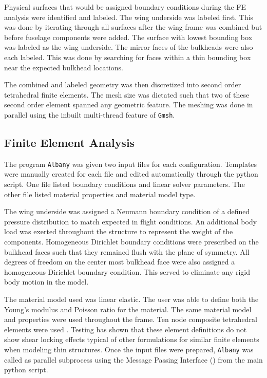 \documentclass[conf]{new-aiaa}
\begin{document}
Physical surfaces that would be assigned boundary conditions 
during the FE analysis were identified and labeled.
The wing underside was labeled first.
This was done by iterating through all surfaces after 
the wing frame was combined but before fuselage components 
were added.
The surface with lowest bounding box was labeled as the 
wing underside.
The mirror faces of the bulkheads were also each labeled.
This was done by searching for faces within a thin
bounding box near the expected bulkhead locations.

The combined and labeled geometry was then discretized 
into second order tetrahedral finite elements.
The mesh size was dictated such that two of these
second order element spanned any geometric feature.
The meshing was done in parallel using the
inbuilt multi-thread feature of \texttt{Gmsh}.


\subsection{Finite Element Analysis}
The program \texttt{Albany} was given two input files for 
each configuration. 
Templates were manually created for each file and edited 
automatically through the python script.
One file listed boundary conditions and linear solver
parameters.
The other file listed material properties and material 
model type.

The wing underside was assigned a
Neumann boundary condition of a defined pressure distribution
to match expected in flight conditions.
An additional body load was exerted throughout the
structure to represent the weight of the components.
Homogeneous Dirichlet boundary conditions were 
prescribed on the bulkhead faces such that
they remained flush with the plane of symmetry.
All degrees of freedom on the center most
bulkhead face were also assigned a
homogeneous Dirichlet boundary condition.
This served to eliminate any rigid body motion in the model.

The material model used was linear elastic.
The user was able to define both the
Young's modulus and Poisson ratio for the material.
The same material model and properties were used throughout
the frame.
Ten node composite tetrahedral elements were used
\cite{ostien_10_node_comp_tet_FE_for_solid_mechanics}.
Testing has shown that these element definitions do not 
show shear locking effects typical of other 
formulations for similar finite elements 
when modeling thin structures.
Once the input files were prepared,
\texttt{Albany} was called as parallel 
subprocess using the Message Passing Interface (\cite{ mpi_standard_1994})
from the main python script.
\end{document}
